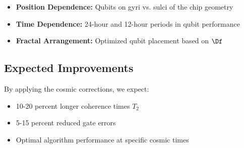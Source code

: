 \begin{itemize}
	\item \textbf{Position Dependence:} Qubits on gyri vs. sulci of the chip geometry
	\item \textbf{Time Dependence:} 24-hour and 12-hour periods in qubit performance
	\item \textbf{Fractal Arrangement:} Optimized qubit placement based on $\Df$
\end{itemize}

\subsection{Expected Improvements}

By applying the cosmic corrections, we expect:

\begin{itemize}
	\item 10-20 percent longer coherence times $T_2$
	\item 5-15 percent reduced gate errors
	\item Optimal algorithm performance at specific cosmic times
\end{itemize}

